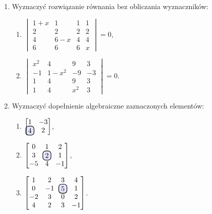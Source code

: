 \documentclass{article}
\newcommand\hlight[1]{\tikz[overlay, remember picture,baseline=-\the\dimexpr\fontdimen22\textfont2\relax]\node[rectangle,fill=blue!50,rounded corners,fill opacity = 0.2,draw,thick,text opacity =1] {$#1$};}
\begin{document}
\begin{enumerate}
    \item Wyznaczyć rozwiązanie równania bez obliczania wyznaczników:
    \begin{enumerate}
        \item $\begin{vmatrix} 1+x & 1 & 1 & 1\\ 2 & 2 & 2 & 2\\ 4 & 6-x & 4 & 4\\ 6 & 6 & 6 & x \end{vmatrix} = 0$,
        \item $\begin{vmatrix} x^{2} & 4 & 9 & 3\\ -1 & 1-x^{2} & -9 & -3\\ 1 & 4 & 9 & 3\\ 1 & 4 & x^{2} & 3 \end{vmatrix} = 0$.
    \end{enumerate}

    \item Wyznaczyć dopełnienie algebraiczne zaznaczonych elementów:
    \begin{enumerate}
        \item $\begin{bmatrix} 1 & -3\\ \hlight{4} & 2 \end{bmatrix}$,
        \item $\begin{bmatrix} 0 & 1 & 2\\ 3 & \hlight{2} & 1\\ -5 & 4 & -1 \end{bmatrix}$,
        \item $\begin{bmatrix} 1 & 2 & 3 & 4\\ 0 & -1 & \hlight{5} & 1\\ -2 & 3 & 0 & 2\\ 4 & 2 & 3 & -1 \end{bmatrix}$.
    \end{enumerate}


\end{enumerate}
\end{document}
